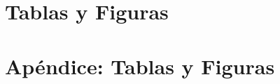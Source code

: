 \documentclass[12pt,a4paper,onecolumn]{article}
\begin{document}

\pagebreak
\singlespacing

\pagebreak

\section*{Tablas y Figuras}


\pagebreak

\appendix
\renewcommand{\theequation}{\Alph{chapter}.\arabic{equation}}

\setcounter{figure}{0}
\setcounter{table}{0}
\makeatletter 
\renewcommand{\thefigure}{A.\@arabic\c@figure}
\renewcommand{\thetable}{A.\@arabic\c@table}

\section{Apéndice: Tablas y Figuras}\label{sec:appendix_tables} 
\end{document}
